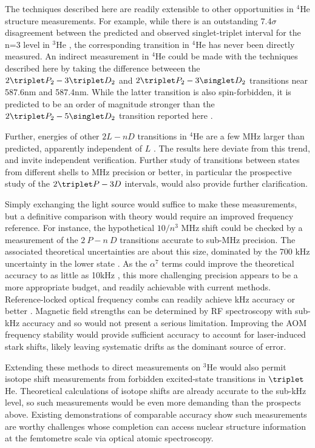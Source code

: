	The techniques described here are readily extensible to other opportunities in $^4$He structure measurements.
	For example, while there is an outstanding 7.4$\sigma$ disagreement between the predicted and observed singlet-triplet interval for the n=3 level in $^3$He \cite{Morton06,Derouard80}, the corresponding transition in $^4$He has never been directly measured.
	An indirect measurement in $^4$He could be made with the techniques described here by taking the difference betweeen the $2\triplet P_2 - 3\triplet D_2$ and $2\triplet P_2 - 3\singlet D_2$ transitions near 587.6nm and 587.4nm.
	While the latter transition is also spin-forbidden, it is predicted to be an order of magnitude stronger than the $2\triplet P_2 - 5\singlet D_2$ transition reported here \cite{Morton06}.

	{Further, energies of other $2L-nD$ transitions in $^4$He are a few MHz larger than predicted, apparently independent of $L$ \cite{Wienczek19,Yerokhin20}.
	The results here deviate from this trend, and invite independent verification.
	Further study of transitions between states from different shells to MHz precision or better, in particular the prospective study of the $2\triplet P - 3 D$ intervals, would also provide further clarification.}

	Simply exchanging the light source would suffice to make these measurements, but a definitive comparison with theory would require an improved frequency reference.
	For instance, the hypothetical $10/n^3$ MHz shift could be checked by a measurement of the $2~P-n~D$ transitions accurate to sub-MHz precision.
	The associated theoretical uncertainties are about this size, dominated by the 700 kHz uncertainty in the lower state \cite{Pachucki17,Wienczek19}.
	As the $\alpha^7$ terms could improve the theoretical accuracy to as little as 10kHz \cite{Pachucki17}, this more challenging precision appears to be a more appropriate budget, and readily achievable with current methods.
	Reference-locked optical frequency combs can readily achieve kHz accuracy or better \cite{Luo15,Rengelink18}.
	Magnetic field strengths can be determined by RF spectroscopy with sub-kHz accuracy and so would not present a serious limitation.
	Improving the AOM frequency stability would provide sufficient accuracy to account for laser-induced stark shifts, likely leaving systematic drifts as the dominant source of error.

	Extending these methods to direct measurements on $^3$He would also permit isotope shift measurements from forbidden excited-state transitions in $\triplet$He.
	Theoretical calculations of isotope shifts are already accurate to the sub-kHz level, so such measurements would be even more demanding than the prospects above.
	Existing demonstrations of comparable accuracy \cite{Rengelink18} show such measurements are worthy challenges whose completion can access nuclear structure information at the femtometre scale via optical atomic spectroscopy.


